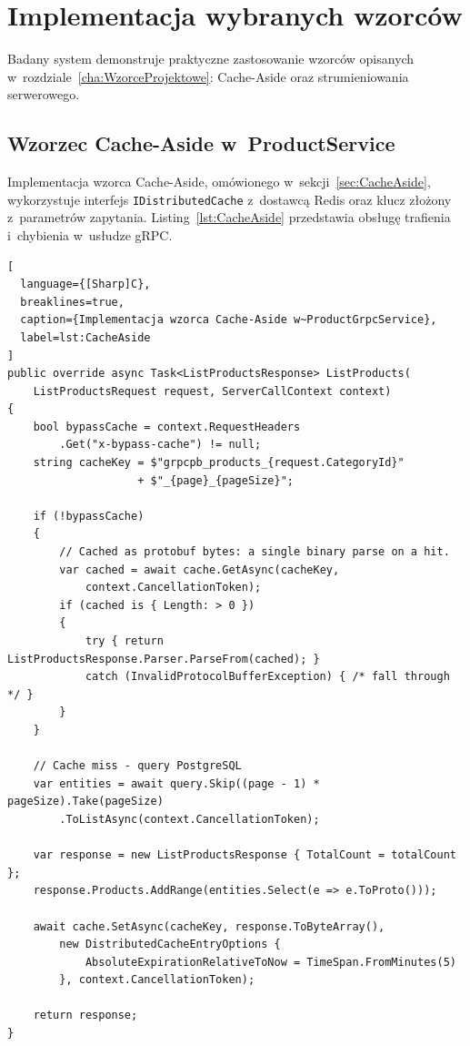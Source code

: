 \section{Implementacja wybranych wzorców}
\label{sec:ImplementacjaWzorcow}

Badany system demonstruje praktyczne zastosowanie wzorców opisanych w~rozdziale~\ref{cha:WzorceProjektowe}: Cache-Aside oraz strumieniowania serwerowego.

\subsection{Wzorzec Cache-Aside w~ProductService}
\label{subsec:CacheAsideImpl}

Implementacja wzorca Cache-Aside, omówionego w~sekcji~\ref{sec:CacheAside}, wykorzystuje interfejs \texttt{IDistributedCache} z~dostawcą Redis oraz klucz złożony z~parametrów zapytania. Listing~\ref{lst:CacheAside} przedstawia obsługę trafienia i~chybienia w~usłudze gRPC.

\begin{lstlisting}[
  language={[Sharp]C},
  breaklines=true,
  caption={Implementacja wzorca Cache-Aside w~ProductGrpcService},
  label=lst:CacheAside
]
public override async Task<ListProductsResponse> ListProducts(
    ListProductsRequest request, ServerCallContext context)
{
    bool bypassCache = context.RequestHeaders
        .Get("x-bypass-cache") != null;
    string cacheKey = $"grpcpb_products_{request.CategoryId}"
                    + $"_{page}_{pageSize}";

    if (!bypassCache)
    {
        // Cached as protobuf bytes: a single binary parse on a hit.
        var cached = await cache.GetAsync(cacheKey,
            context.CancellationToken);
        if (cached is { Length: > 0 })
        {
            try { return ListProductsResponse.Parser.ParseFrom(cached); }
            catch (InvalidProtocolBufferException) { /* fall through */ }
        }
    }

    // Cache miss - query PostgreSQL
    var entities = await query.Skip((page - 1) * pageSize).Take(pageSize)
        .ToListAsync(context.CancellationToken);

    var response = new ListProductsResponse { TotalCount = totalCount };
    response.Products.AddRange(entities.Select(e => e.ToProto()));

    await cache.SetAsync(cacheKey, response.ToByteArray(),
        new DistributedCacheEntryOptions {
            AbsoluteExpirationRelativeToNow = TimeSpan.FromMinutes(5)
        }, context.CancellationToken);

    return response;
}
\end{lstlisting}

